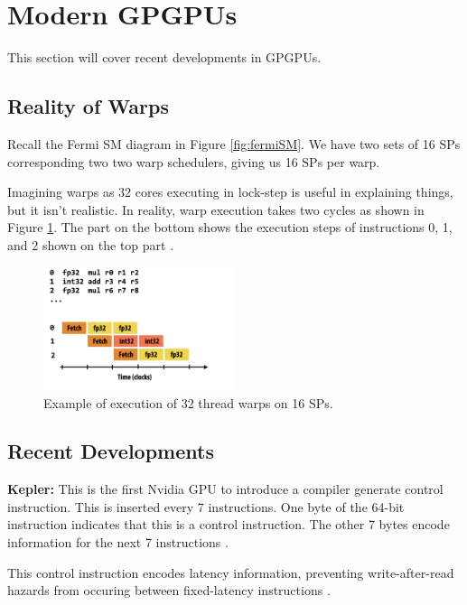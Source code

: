 \section{Modern GPGPUs}

This section will cover recent developments in GPGPUs.

\subsection{Reality of Warps}

Recall the Fermi SM diagram in Figure \ref{fig:fermiSM}.
We have two sets of 16 SPs corresponding
two two warp schedulers, giving us 16 SPs per warp.

Imagining warps as 32 cores executing in lock-step is useful in explaining things,
but it isn't realistic. In reality, warp execution takes two cycles as shown
in Figure \ref{fig:exec}. The part on the bottom shows the execution steps
of instructions 0, 1, and 2 shown on the top part \cite{yt}.

\begin{figure}[h]
    \centering
    \includegraphics[width=0.5\textwidth]{assets/execex.png}
    \caption{Example of execution of 32 thread warps on 16 SPs.}
    \label{fig:exec}
\end{figure}

\subsection{Recent Developments}

\textbf{Kepler:} This is the first Nvidia GPU to introduce a compiler generate control instruction.
This is inserted every 7 instructions. One byte of the 64-bit instruction indicates
that this is a control instruction. The other 7 bytes encode information for the
next 7 instructions \cite{chipsandcheeseInsideKepler}.

This control instruction encodes latency information, preventing write-after-read hazards
from occuring between fixed-latency instructions \cite{chipsandcheeseInsideKepler}.

